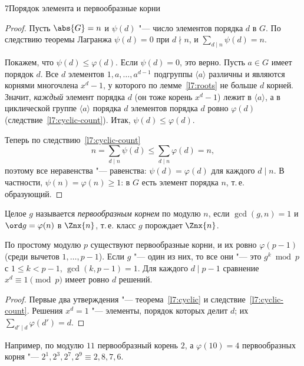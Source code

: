 \begin{lecture}{7}{Порядок элемента и первообразные корни}
\begin{proof}
Пусть $\abs{G} = n$ и $\psi(d)$ "--- число элементов порядка $d$ в $G$. По следствию
теоремы Лагранжа $\psi(d) = 0$ при $d \nmid n$, и $\sum_{d \mid n} \psi(d) = n$.

Покажем, что $\psi(d) \le \varphi(d)$. Если $\psi(d) = 0$, это верно. Пусть $a \in G$ имеет
порядок $d$. Все $d$ элементов $1, a, \dots, a^{d-1}$ подгруппы $\langle a \rangle$ различны и
являются корнями многочлена $x^d - 1$, у которого по лемме~\ref{l7:roots} не больше $d$ корней.
Значит, \emph{каждый} элемент порядка $d$ (он тоже корень $x^d - 1$) лежит в $\langle a \rangle$,
а в циклической группе $\langle a \rangle$ порядка $d$ элементов порядка $d$ ровно $\varphi(d)$
(следствие~\ref{l7:cyclic-count}). Итак, $\psi(d) \le \varphi(d)$.

Теперь по следствию~\ref{l7:cyclic-count}
\[
  n = \sum_{d \mid n} \psi(d) \le \sum_{d \mid n} \varphi(d) = n,
\]
поэтому все неравенства "--- равенства: $\psi(d) = \varphi(d)$ для каждого $d \mid n$. В
частности, $\psi(n) = \varphi(n) \ge 1$: в $G$ есть элемент порядка $n$, т.\,е. образующий.
\end{proof}

\begin{definition}
Целое $g$ называется \emph{первообразным корнем} по модулю $n$, если $\gcd(g, n) = 1$ и
$\ord g = \varphi(n)$ в $\Znx{n}$, т.\,е. класс $g$ порождает $\Znx{n}$.
\end{definition}

\begin{corollary}\label{l7:count-roots}
По простому модулю $p$ существуют первообразные корни, и их ровно $\varphi(p - 1)$ (среди
вычетов $1, \dots, p - 1$). Если $g$ "--- один из них, то все они "--- это $g^k \bmod p$ с
$1 \le k < p - 1$, $\gcd(k, p - 1) = 1$. Для каждого $d \mid p - 1$ сравнение
$x^d \equiv 1 \pmod p$ имеет ровно $d$ решений.
\end{corollary}

\begin{proof}
Первые два утверждения "--- теорема~\ref{l7:cyclic} и следствие~\ref{l7:cyclic-count}. Решения
$x^d = 1$ "--- элементы, порядок которых делит $d$; их $\sum_{d' \mid d} \varphi(d') = d$.
\end{proof}

Например, по модулю $11$ первообразный корень $2$, а $\varphi(10) = 4$ первообразных корня "---
$2^1, 2^3, 2^7, 2^9 \equiv 2, 8, 7, 6$.



\end{lecture}
